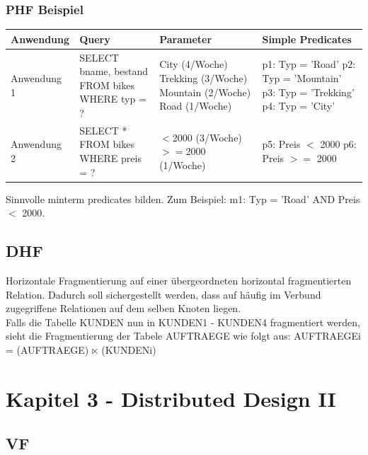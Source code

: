 \documentclass[a4paper,11pt]{article}
\begin{document}
\subsubsection{PHF Beispiel}
\begin{tabular}{| p{3cm} | p{5cm} | p{4cm} | p{4cm}|}
\hline
Anwendung & Query & Parameter & Simple Predicates \\ \hline
Anwendung 1 & SELECT bname, bestand \newline FROM bikes \newline WHERE typ = ? & 
City (4/Woche) \newline
Trekking (3/Woche) \newline
Mountain (2/Woche) \newline
Road (1/Woche) & 
p1: Typ = 'Road' \newline
p2: Typ = 'Mountain' \newline
p3: Typ = 'Trekking' \newline
p4: Typ = 'City'
\\ \hline
Anwendung 2 & SELECT * \newline FROM bikes \newline WHERE preis = ? &
$<$2000 (3/Woche) \newline
$>=$2000 (1/Woche) \newline &
p5: Preis $<$ 2000 \newline
p6: Preis $>=$ 2000
\\ \hline
\end{tabular}
Sinnvolle minterm predicates bilden. Zum Beispiel: m1: Typ = 'Road' AND Preis $<$ 2000.\\
\subsection{DHF}
Horizontale Fragmentierung auf einer übergeordneten horizontal fragmentierten Relation. Dadurch soll sichergestellt werden, dass auf häufig im Verbund zugegriffene Relationen auf dem selben Knoten liegen.\\
Falls die Tabelle KUNDEN nun in KUNDEN1 - KUNDEN4 fragmentiert werden, sieht die Fragmentierung der Tabele AUFTRAEGE wie folgt aus: AUFTRAEGEi = (AUFTRAEGE) $\ltimes$ (KUNDENi)
\section{Kapitel 3 - Distributed Design II}
\subsection{VF}
\end{document}
